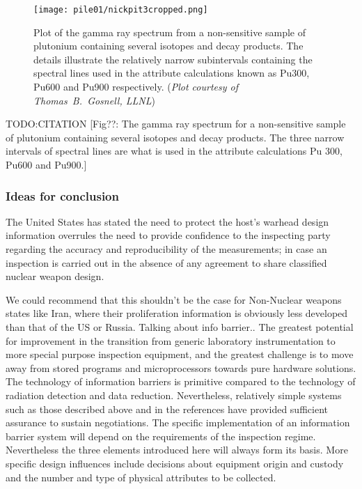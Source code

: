 \documentclass[twoside,titlepage,11pt,twocolumn,a4paper]{article}
\begin{document}
\begin{figure}
  \texttt{[image: pile01/nickpit3cropped.png]}
  \caption{Plot of the gamma ray spectrum from a non-sensitive sample
    of plutonium containing several isotopes and decay products. The
    details illustrate the relatively narrow subintervals containing
    the spectral lines used in the attribute calculations known as
    Pu300, Pu600 and Pu900 respectively. (\emph{Plot courtesy of
      Thomas~B.~Gosnell, LLNL})}
\end{figure}

TODO:CITATION
\citep{wolford2000} [Fig??: The gamma ray
  spectrum for a non-sensitive sample of plutonium containing several
  isotopes and decay products. The three narrow intervals of spectral
  lines are what is used in the attribute calculations Pu 300, Pu600
  and Pu900.]

\subsubsection{Ideas for conclusion}
The United States has stated the need to protect the host's warhead
design information overrules the need to provide confidence to the
inspecting party regarding the accuracy and reproducibility of the
measurements; in case an inspection is carried out in the absence of
any agreement to share classified nuclear weapon design.

We could recommend that this shouldn't be the case for Non-Nuclear
weapons states like Iran, where their proliferation information is
obviously less developed than that of the US or Russia.  Talking about
info barrier.. The greatest potential for improvement in the
transition from generic laboratory instrumentation to more special
purpose inspection equipment, and the greatest challenge is to move
away from stored programs and microprocessors towards pure hardware
solutions.  The technology of information barriers is primitive
compared to the technology of radiation detection and data
reduction. Nevertheless, relatively simple systems such as those
described above and in the references have provided sufficient
assurance to sustain negotiations. The specific implementation of an
information barrier system will depend on the requirements of the
inspection regime. Nevertheless the three elements introduced here
will always form its basis. More specific design influences include
decisions about equipment origin and custody and the number and type
of physical attributes to be collected. \citep{wolford2000}
\end{document}
